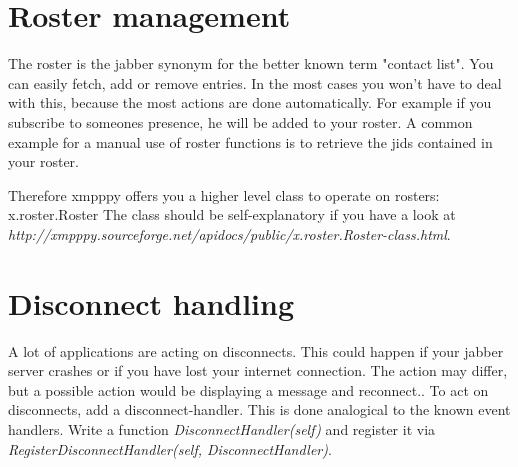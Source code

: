 \section{Roster management}
The roster is the jabber synonym for the better known term "contact list". You can easily fetch, add or remove entries.
In the most cases you won't have to deal with this, because the most actions are done automatically.
For example if you subscribe to someones presence, he will be added to your roster.
A common example for a manual use of roster functions is to retrieve the jids contained in your roster.

Therefore xmpppy offers you a higher level class to operate on rosters: x.roster.Roster
\newline
The class should be self-explanatory if you have a look at
\newline \textit{http://xmpppy.sourceforge.net/apidocs/public/x.roster.Roster-class.html}.

\section{Disconnect handling}

A lot of applications are acting on disconnects. This could happen if your jabber server crashes or if you have lost your internet connection. The action may differ, but a possible action would be displaying a message and reconnect..
To act on disconnects, add a disconnect-handler. This is done analogical to the known event handlers.
Write a function \textit{DisconnectHandler(self)} and register it via \textit{RegisterDisconnectHandler(self, DisconnectHandler)}.






